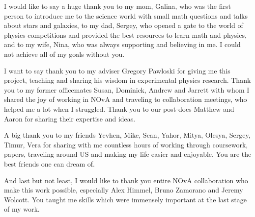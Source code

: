 
I would like to say a huge thank you to my mom, Galina, who was the first person to introduce me
to the science world with small math questions and talks about stars and galaxies, to my 
dad, Sergey, who opened a gate to the world of physics competitions and provided the best resources 
to learn math and physics, and to my wife, Nina, who was always supporting and believing in me.
I could not achieve all of my goals without you. 

I want to say thank you to my adviser Gregory Pawloski for giving me this project, teaching and
sharing his wisdom in experimental physics research. Thank you to my former officemates
Susan, Dominick, Andrew and Jarrett with whom I shared the joy of working in NOvA and 
traveling to collaboration meetings, who helped me a lot when I struggled. Thank you
to our post-docs Matthew and Aaron for sharing their expertise and ideas.

A big thank you to my friends Yevhen, Mike, Sean, Yahor, Mitya, 
Olesya, Sergey, Timur, Vera for sharing with me countless hours of working through coursework,
papers, traveling around US and making my life easier and enjoyable. You are the best friends
one can dream of. 

And last but not least, I would like to thank you entire NOvA collaboration who make this work
possible, especially Alex Himmel, Bruno Zamorano and Jeremy Wolcott. You taught me skills
which were immensely important at the last stage of my work. 

